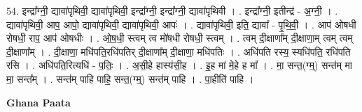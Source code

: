 \documentclass[17pt]{extarticle}
\begin{document}
54. इन्द्रा᳚ग्नी॒ द्यावा॑पृथिवी॒ द्यावा॑पृथिवी॒ इन्द्रा᳚ग्नी॒ इन्द्रा᳚ग्नी॒ द्यावा॑पृथिवी । . इन्द्रा᳚ग्नी॒ इतीन्द्र॑ - अ॒ग्नी॒ । . द्यावा॑पृथिवी॒ आप॒ आपो॒ द्यावा॑पृथिवी॒ द्यावा॑पृथिवी॒ आपः॑ । . द्यावा॑पृथिवी॒ इति॒ द्यावा᳚ - पृ॒थि॒वी॒ । . आप॑ ओषधी रोषधी॒ राप॒ आप॑ ओषधीः । . ओ॒ष॒धी॒ स्त्वम् त्व मो॑षधी रोषधी॒ स्त्वम् । . त्वम् दी॒क्षाणा᳚म् दी॒क्षाणा॒म् त्वम् त्वम् दी॒क्षाणा᳚म् । . दी॒क्षाणा॒ मधि॑पति॒रधि॑पतिर् दी॒क्षाणा᳚म् दी॒क्षाणा॒ मधि॑पतिः । . अधि॑पति रस्य॒ स्यधि॑पति॒ रधि॑पति रसि । . अधि॑पति॒रित्यधि॑ - प॒तिः॒ । . अ॒सी॒हे हास्य॑सी॒ह । . इ॒ह मा॑ मे॒हे ह मा᳚ । . मा॒ सन्त॒(ग्म्॒) सन्त॑म् मा मा॒ सन्त᳚म् । . सन्त॑म् पाहि पाहि॒ सन्त॒(ग्म्॒) सन्त॑म् पाहि । . पा॒हीति॑ पाहि । \newline

\textbf{Ghana Paata } \newline
\end{document}

